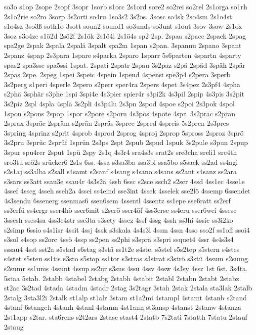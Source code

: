 {so3o
s1op
2sope
2sopf
3sopr
1sorb
s1orc
2s1ord
sore2
so2rei
so2rel
2s1orga
so1rh
2s1o2rie
so2ro
3sorp
3s2orti
so4ru
1so3s2
3s2os.
3sosc
so4sk
2so4sm
2s1o4st
s1o4sz
3so3ß
soth1o
3sott
soun2
sound1
so3unds
so3unt
s1out
3sov
3sow
2s1ox
3soz
s3o4ze
s1ö2d
2sö2f
2s1ök
2s1ö4l
2s1ö4s
sp2
2sp.
2spaa
s2pace
2spack
2spag
spa2ge
2spak
2spala
2spalä
3spalt
spa2m
1span
s2pan.
3spannu
2spano
3spant
2spanz
4spap
2s3para
1spare
s4parka
2sparo
1sparr
5s6parten
4spartn
4sparty
spas2
spa3sse
spa5ssi
1spat.
2spati
2spatr
2spau
3s2paz
s2pä
2späd
3späh
2spär
2späs
2spe.
2speg
1spei
3speic
4spein
1spend
4spensi
spe3p4
s2pera
3sperb
3s2perg
s1peri
4sperle
2spero
s2perr
sper4ra
2spers
4spet
3s4pez
2s3pf4
4spha
s2phä
3sphär
s3phe
1spi
3spi4e
4s3pier
spier4r
s3pi2k
4s3pil
2spip
4s3pis
3s2pit
3s2piz
2spl
4spla
4splä
3s2pli
4s3p4lu
2s3pn
2spod
4spoe
s2poi
2s3pok
4spol
1spon
s2pons
2spop
1spor
s2pore
s2porn
4s3pos
4spote
4spr.
3s2prac
s2pran
2sprax
3spräc
2spräm
s2prän
2spräs
3sprec
2spred
4spreis
5s2pren
2s3pres
3spring
4sprinz
s2prit
4sprob
4sprod
2sprog
4sproj
2sprop
5spross
2sproz
3sprö
3s2pru
3sprüc
2sprüf
1sprün
2s3ps
2spt
2spub
2spud
1spuk
3s2pule
s3pun
2spup
3spur
spu4rer
2sput
1spü
2spy
2s1q
4s3r4
sra4s3s
srat2s
sre3cha
sreli1
sre4th
sro3tu
srö2s
srücker6
2s1s
6ss.
4ssa
s3sa3ba
ssa3bl
ssa5bo
s5sack
ss2ad
ss4agi
s2s1aj
ss3alba
s2sall
s4samt
s2sanf
s4sang
s4sano
s4sans
ss2ant
s4sanz
ss2ara
s3sars
ss3att
ssau3e
ssau4r
4s3s2ä
4ssb
6ssc
s2sce
ssch2
s2scr
4ssd
4ss1ec
4sse1e
4ssef
4sseg
4sseh
sseh2a
4ssei
ss4eind
sse3int
4ssek
4sselek
sse2lö
4ssemp
6ssendet
4s3sendu
6ssenerg
ssenmas6
ssen6sem
4ssentl
4ssentz
ss1epe
sse6ratt
ss2erf
ss3erfü
ss4ergr
sser4hö
sser6mit
s2serö
sser4öf
4ss3erse
ss4eru
sser6wei
4ssesc
3ssesh
sses4sa
4ss3e4str
sse3ta
s3sety
4ssez
4ssf
4ssg
4ssh
ss3hi
4ssic
ss3i2ko
s2simp
6ssio
s4s1isr
4ssit
4ssj
4ssk
s3skala
4s4s3l
4ssm
4ssn
4sso
sso2f
ss1off
ssoi4
s3sol
s4sop
ss2orc
4ssö
4ssp
ss2pen
ss2phi
s3sprä
s3spri
ssquet4
4ssr
4s4s3s4
sssau4
4sst
sst2a
s5stad
s6stag
s3stä
ss1t2e
s4ste.
s5stel
s5s2tep
s5stern
s4stes
s4stet
s5steu
ss1tis
s3sto
s5stop
ss1tor
s3stras
s3strat
s3strö
s3stü
4ssum
s2sumg
s2sumr
ss1ums
4ssunt
4ssup
ss2ur
s3sus
4ssü
4ssv
4ssw
4s3sy
4ssz
1st
6st.
3s4ta.
5staa
5stab.
2stabb
4stabel
2stabg
2stabh
4stabit
2stabl
2stabn
2stabt
2stabz
st2ac
3s2tad
4stada
4stadm
4stadr
2stag
3s2tagr
3stah
2stak
2stala
sta3lak
2stalb
2stalg
3sta3l2i
2stalk
st1alp
st1alr
3stam
st1a2mi
4stampl
4stamt
4stanb
s2tand
4stanf
6stangeh
4stanh
4stanl
4stanm
4st1ann
st3ansp
4stanst
2stanw
4stanza
2st1app
s2tar.
sta6rens
s2t2ars
2stasc
stast4
2statb
7s2tati
7statth
7statu
2stauf
2staug
}
